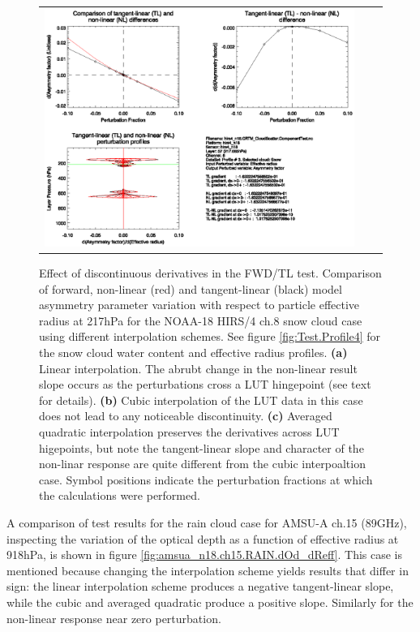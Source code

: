 \begin{figure}[htp]
\begin{tabular}{c c c}
    \includegraphics[bb=90 400 300 540,clip,scale=0.7]{graphics/Cloud/TL/hirs4_n18.ch8.SNOW.AVGQUAD.dg_dReff.eps} 
  \end{tabular}
  \caption{Effect of discontinuous derivatives in the FWD/TL test. Comparison of forward, non-linear (red) and tangent-linear (black) model asymmetry parameter variation with respect to particle effective radius at 217hPa for the NOAA-18 HIRS/4 ch.8 snow cloud case using different interpolation schemes. See figure \ref{fig:Test.Profile4} for the snow cloud water content and effective radius profiles. \textbf{(a)} Linear interpolation. The abrubt change in the non-linear result slope occurs as the perturbations cross a LUT hingepoint (see text for details). \textbf{(b)} Cubic interpolation of the LUT data in this case does not lead to any noticeable discontinuity. \textbf{(c)} Averaged quadratic interpolation preserves the derivatives across LUT higepoints, but note the tangent-linear slope and character of the non-linar response are quite different from the cubic interpoaltion case. Symbol positions indicate the perturbation fractions at which the calculations were performed.}
  \label{fig:hirs4_n18.ch8.SNOW.dg_dReff.TL}
\end{figure}

A comparison of test results for the rain cloud case for AMSU-A ch.15 (89GHz), inspecting the variation of the optical depth as a function of effective radius at 918hPa, is shown in figure \ref{fig:amsua_n18.ch15.RAIN.dOd_dReff}. This case is mentioned because changing the interpolation scheme yields results that differ in sign: the linear interpolation scheme produces a negative tangent-linear slope, while the cubic and averaged quadratic produce a positive slope. Similarly for the non-linear response near zero perturbation.

